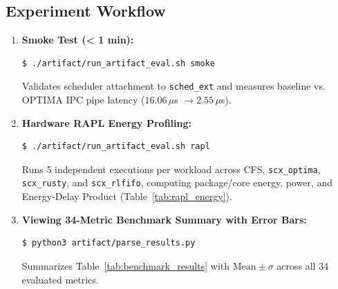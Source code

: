 \documentclass[letterpaper,twocolumn,10pt]{article}
\begin{document}
\subsection{Experiment Workflow}
\begin{enumerate}
    \item \textbf{Smoke Test (< 1 min):}
    \begin{verbatim}
$ ./artifact/run_artifact_eval.sh smoke
    \end{verbatim}
    Validates scheduler attachment to \texttt{sched\_ext} and measures baseline vs. OPTIMA IPC pipe latency ($16.06\,\mu$s $\to 2.55\,\mu$s).
    \item \textbf{Hardware RAPL Energy Profiling:}
    \begin{verbatim}
$ ./artifact/run_artifact_eval.sh rapl
    \end{verbatim}
    Runs 5 independent executions per workload across CFS, \texttt{scx\_optima}, \texttt{scx\_rusty}, and \texttt{scx\_rlfifo}, computing package/core energy, power, and Energy-Delay Product (Table~\ref{tab:rapl_energy}).
    \item \textbf{Viewing 34-Metric Benchmark Summary with Error Bars:}
    \begin{verbatim}
$ python3 artifact/parse_results.py
    \end{verbatim}
    Summarizes Table~\ref{tab:benchmark_results} with $\text{Mean} \pm \sigma$ across all 34 evaluated metrics.
\end{enumerate}
\end{document}
